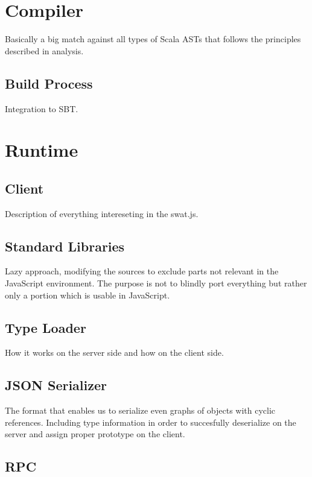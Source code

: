 \documentclass[12pt,a4paper]{report}
\begin{document}
\section{Compiler}

Basically a big match against all types of Scala ASTs that follows the principles described in analysis.

\subsection{Build Process}

Integration to SBT.

\section{Runtime}

\subsection{Client}

Description of everything intereseting in the swat.js.

\subsection{Standard Libraries}

Lazy approach, modifying the sources to exclude parts not relevant in the JavaScript environment. The purpose is not to blindly port everything but rather only a portion which is usable in JavaScript.

\subsection{Type Loader}

How it works on the server side and how on the client side.

\subsection{JSON Serializer}

The format that enables us to serialize even graphs of objects with cyclic references. Including type information in order to succesfully deserialize on the server and assign proper prototype on the client.

\subsection{RPC}
\end{document}
